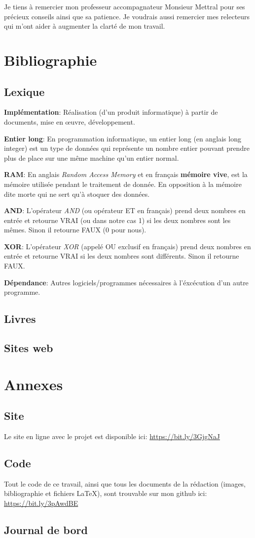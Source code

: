 \documentclass[a4paper]{article}
\newcommand{\lexique}[2]{\item{\textbf{#1}:} #2}
\begin{document}
    Je tiens à remercier mon professeur accompagnateur Monsieur Mettral pour ses précieux conseils ainsi que sa patience. Je voudrais aussi remercier mes relecteurs qui m'ont aider à augmenter la clarté de mon travail.
\newpage
\section{Bibliographie}
\subsection{Lexique}
    \begin{description}
        \lexique{Implémentation}{Réalisation (d’un produit informatique) à partir de documents, mise en œuvre, développement.}
        \lexique{Entier long}{En programmation informatique, un entier long (en anglais long integer) est un type de données qui représente un nombre entier pouvant prendre plus de place sur une même machine qu'un entier normal.}
        \lexique{RAM}{En anglais \textit{Random Access Memory} et en français \textbf{mémoire vive}, est la mémoire utilisée pendant le traitement de donnée. En opposition à la mémoire dite morte qui ne sert qu'à stoquer des données.}
        \lexique{AND}{L'opérateur \textit{AND} (ou opérateur ET en français) prend deux nombres en entrée et retourne VRAI (ou dans notre cas 1) si les deux nombres sont les mêmes. Sinon il retourne FAUX (0 pour nous).}
        \lexique{XOR}{L'opérateur \textit{XOR} (appelé OU exclusif en français) prend deux nombres en entrée et retourne VRAI si les deux nombres sont différents. Sinon il retourne FAUX.}
	    \lexique{Dépendance}{Autres logiciels/programmes nécessaires à l'éxcécution d'un autre programme.}
    \end{description}
\subsection{Livres}
\printbibliography[heading=none, type=book]
\subsection{Sites web}
\printbibliography[heading=none, type=misc]

\section{Annexes}
\subsection{Site}
    Le site en ligne avec le projet est disponible ici: \url{https://bit.ly/3GjgNaJ}
\subsection{Code}
    Tout le code de ce travail, ainsi que tous les documents de la rédaction (images, bibliographie et fichiers LaTeX), sont trouvable sur mon github ici: \url{https://bit.ly/3pAwdBE}
\subsection{Journal de bord}
    
\end{document}
